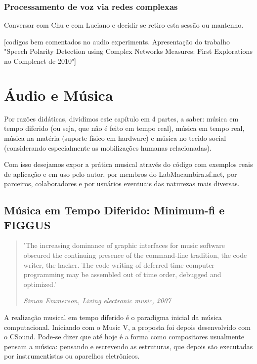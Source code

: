       \subsubsection{Processamento de voz via redes complexas}
Conversar com Chu e com Luciano e decidir se retiro esta sessão ou mantenho.

      [codigos bem comentados no audio experiments. Apresentação do trabalho "Speech Polarity Detection using Complex Networks Measures: First Explorations no Complenet de 2010"]



\section{Áudio e Música}

Por razões didáticas, dividimos este capítulo em 4 partes, a saber: música em tempo diferido (ou seja, que não é feito em tempo real),
música em tempo real,  música na matéria (suporte físico em hardware) e música no tecido social
(considerando especialmente as mobilizações humanas relacionadas).

Com isso desejamos expor a prática musical através do código
com exemplos reais de aplicação e em uso pelo autor, por membros do LabMacambira.sf.net,
por parceiros, colaboradores e por usuários eventuais das naturezas mais diversas.

  \subsection{Música em Tempo Diferido: Minimum-fi e FIGGUS}

\begin{quotation}
\small
'The increasing dominance of graphic interfaces for music software obscured 
the continuing presence of the command-line tradition, 
the code writer, the hacker. The code writing of deferred time 
computer programming may be assembled out of time order, debugged and optimized.'

\emph{Simon Emmerson, Living electronic music, 2007}
\end{quotation}

A realização musical em tempo diferido é o paradigma inicial da música computacional.
Iniciando com o Music V, a proposta foi depois desenvolvido com o CSound. Pode-se dizer
que até hoje é a forma como compositores usualmente pensam a música: pensando
e escrevendo as estruturas, que depois são executadas por instrumentistas ou aparelhos eletrônicos.

